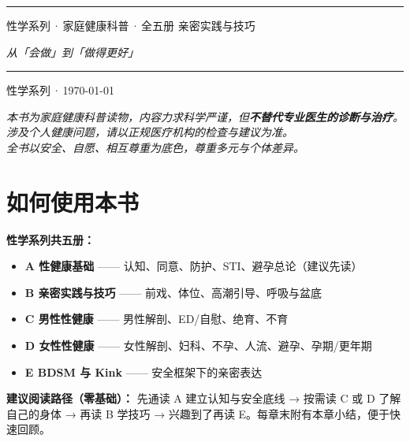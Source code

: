 \documentclass[12pt,UTF8,openany]{ctexbook}
\begin{document}
\begin{titlepage}
\centering
\vspace*{1.5cm}
\vspace{0.6cm}
\noindent\rule{\textwidth}{0.4pt}
\vspace{0.5cm}
\myhei{} 性学系列\,·\,家庭健康科普\,·\,全五册
\vspace{2.5cm}
\myhei{} 亲密实践与技巧\par
\vspace{1.2cm}
\itshape{} 从「会做」到「做得更好」\par
\vspace{5.2cm}
\noindent\rule{\textwidth}{0.4pt}
\vspace{0.5cm}
 性学系列\,·\,\today
\end{titlepage}

\begin{center}\itshape
本书为家庭健康科普读物，内容力求科学严谨，但\textbf{不替代专业医生的诊断与治疗}。\\
涉及个人健康问题，请以正规医疗机构的检查与建议为准。\\
全书以安全、自愿、相互尊重为底色，尊重多元与个体差异。\par\end{center}
\clearpage

\chapter*{如何使用本书}
\noindent\textbf{性学系列共五册：}
\begin{itemize}[leftmargin=2em]
\item \textbf{A 性健康基础} —— 认知、同意、防护、STI、避孕总论（建议先读）
\item \textbf{B 亲密实践与技巧} —— 前戏、体位、高潮引导、呼吸与盆底
\item \textbf{C 男性性健康} —— 男性解剖、ED/自慰、绝育、不育
\item \textbf{D 女性性健康} —— 女性解剖、妇科、不孕、人流、避孕、孕期/更年期
\item \textbf{E BDSM 与 Kink} —— 安全框架下的亲密表达
\end{itemize}
\vspace{0.6em}
\noindent\textbf{建议阅读路径（零基础）：} 先通读 A 建立认知与安全底线 → 按需读 C 或 D 了解自己的身体 → 再读 B 学技巧 → 兴趣到了再读 E。每章末附有本章小结，便于快速回顾。
\clearpage
\end{document}
